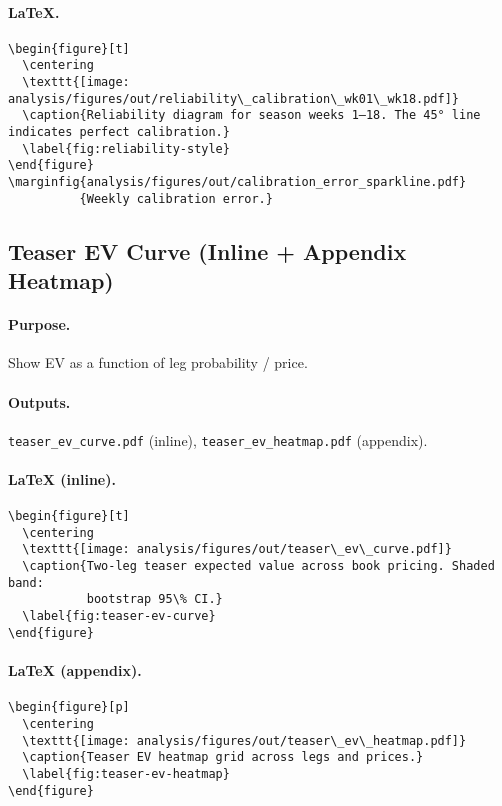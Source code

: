 \paragraph{LaTeX.}
\begin{verbatim}
\begin{figure}[t]
  \centering
  \texttt{[image: analysis/figures/out/reliability\_calibration\_wk01\_wk18.pdf]}
  \caption{Reliability diagram for season weeks 1–18. The 45° line indicates perfect calibration.}
  \label{fig:reliability-style}
\end{figure}
\marginfig{analysis/figures/out/calibration_error_sparkline.pdf}
          {Weekly calibration error.}
\end{verbatim}

\subsection{Teaser EV Curve (Inline + Appendix Heatmap)}
\paragraph{Purpose.} Show EV as a function of leg probability / price.
\paragraph{Outputs.} \texttt{teaser\_ev\_curve.pdf} (inline), \texttt{teaser\_ev\_heatmap.pdf} (appendix).
\paragraph{LaTeX (inline).}
\begin{verbatim}
\begin{figure}[t]
  \centering
  \texttt{[image: analysis/figures/out/teaser\_ev\_curve.pdf]}
  \caption{Two-leg teaser expected value across book pricing. Shaded band:
           bootstrap 95\% CI.}
  \label{fig:teaser-ev-curve}
\end{figure}
\end{verbatim}
\paragraph{LaTeX (appendix).}
\begin{verbatim}
\begin{figure}[p]
  \centering
  \texttt{[image: analysis/figures/out/teaser\_ev\_heatmap.pdf]}
  \caption{Teaser EV heatmap grid across legs and prices.}
  \label{fig:teaser-ev-heatmap}
\end{figure}
\end{verbatim}

